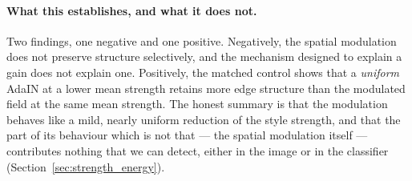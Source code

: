 \paragraph{What this establishes, and what it does not.}
Two findings, one negative and one positive. Negatively, the spatial
modulation does not preserve structure selectively, and the mechanism
designed to explain a gain does not explain one. Positively, the matched
control shows that a \emph{uniform} AdaIN at a lower mean strength retains
more edge structure than the modulated field at the same mean strength. The
honest summary is that the modulation behaves like a mild, nearly uniform
reduction of the style strength, and that the part of its behaviour which
is not that --- the spatial modulation itself --- contributes nothing that
we can detect, either in the image or in the classifier
(Section~\ref{sec:strength_energy}).
